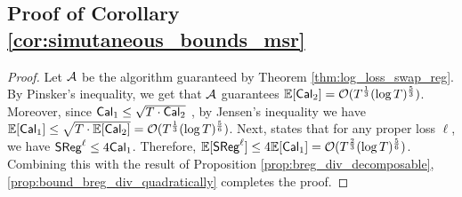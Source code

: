 \subsection{Proof of Corollary \ref{cor:simutaneous_bounds_msr}}
\begin{proof}
    Let $\cA$ be the algorithm guaranteed by Theorem \ref{thm:log_loss_swap_reg}.  By Pinsker's inequality, we get that $\cA$ guarantees $\mathbb{E}[\cal_{2}] = \cO(T^{\frac{1}{3}} (\log T) ^ {\frac{5}{3}})$. Moreover, since $\cal_{1} \le \sqrt{T \cdot \cal_{2}}$ \citep[Lemma 13]{kleinberg2023u}, by Jensen's inequality we have $\mathbb{E}[\cal_{1}] \le \sqrt{T \cdot \mathbb{E}[\cal_{2}]} = \cO(T^{\frac{1}{3}} (\log T) ^ {\frac{5}{6}})$. Next, \cite[Theorem 12]{kleinberg2023u} states that for any proper loss $\ell$, we have $\sreg^{\ell} \le 4 \cal_{1}$. Therefore, $\mathbb{E}[\sreg^{\ell}] \le 4 \mathbb{E}[\cal_{1}] = \cO(T^{\frac{2}{3}} (\log T) ^ {\frac{5}{6}})$. Combining this with the result of Proposition \ref{prop:breg_div_decomposable}, \ref{prop:bound_breg_div_quadratically} completes the proof.
\end{proof}
